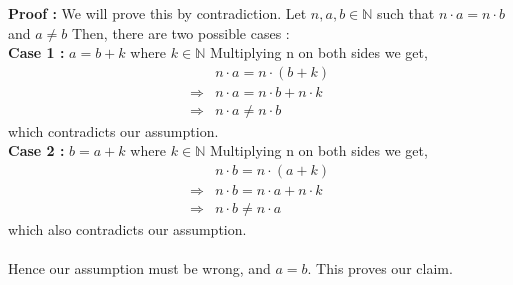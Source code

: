 \documentclass[10pt]{article}
\newcommand{\nn}{\mathbb{N}}
\begin{document}
        \textbf{Proof : }We will prove this by contradiction. Let  $n,a,b \in \nn$ such that $n \cdot a = n \cdot b$\\ and $a \neq b$ Then, there are two possible cases : \\
        \textbf{Case 1 : } $a = b + k$ where $k \in \nn$
        Multiplying n on both sides we get, 
        \begin{align*}
            &n \cdot a = n \cdot (b + k)\\
            \Rightarrow &n \cdot a = n \cdot b + n \cdot k \tag{Distributive Property}\\
            \Rightarrow &n \cdot a \neq n \cdot b
        \end{align*} 
        which contradicts our assumption. \\
        \textbf{Case 2 : } $b = a + k$ where $k \in \nn$
        Multiplying n on both sides we get,
        \begin{align*}
            &n \cdot b = n \cdot (a + k)\\
            \Rightarrow &n \cdot b = n \cdot a + n \cdot k \tag{Distributive Property}\\
            \Rightarrow &n \cdot b \neq n \cdot a
        \end{align*} 
        which also contradicts our assumption. 
\\ \\
        Hence our assumption must be wrong, and $a = b$. This proves our claim.
\end{document}

